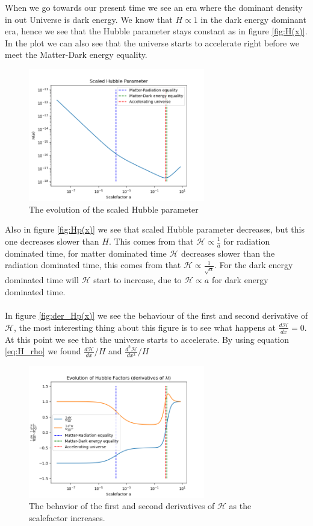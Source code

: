 \documentclass{aa}
\begin{document}
When we go towards our present time we see an era where the dominant density in out Universe is dark energy. We know that $H\propto 1$ in the dark energy dominant era, hence we see that the Hubble parameter stays constant as in figure \eqref{fig:H(x)}. In the plot we can also see that the universe starts to accelerate  right before we meet the Matter-Dark energy equality. 
\begin{figure}[H]
	\centering
	\includegraphics[width=77mm]{Scaled Hubble Parameter.png}
	\caption{The evolution of the scaled Hubble parameter}
	\label{fig:Hp(x)}
\end{figure}
Also in figure \eqref{fig:Hp(x)} we see that scaled Hubble parameter decreases, but this one decreases slower than $H$. This comes from that $\mathcal{H}\propto \frac{1}{a}$ for radiation dominated time, for matter dominated time $\mathcal{H}$ decreases slower than the  radiation dominated time, this comes from that $\mathcal{H}\propto \frac{1}{\sqrt{a}}$. For the dark energy dominated time will $\mathcal{H}$ start to increase, due to $\mathcal{H}\propto {a}$ for dark energy dominated time. \\
\\
In figure \eqref{fig:der_Hp(x)} we see the behaviour of the first and second derivative of $\mathcal{H}$, the most interesting thing about this figure is to see what happens at $\frac{d\mathcal{H}}{dx}=0$. At this point we see that the universe starts to accelerate. By using equation \eqref{eq:H_rho} we found $\frac{d\mathcal{H}}{dx}/H$ and $\frac{d^2\mathcal{H}}{dx^2}/H$
\begin{figure}[H]
	\centering
	\includegraphics[width=77mm]{der_Hp.png}
	\caption{The behavior of the first and second derivatives of $\mathcal{H}$ as the scalefactor increases.}
	\label{fig:der_Hp(x)}
\end{figure}
\end{document}
